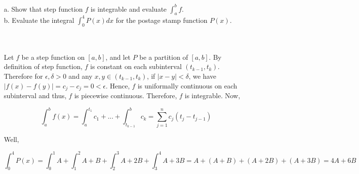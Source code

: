 a. Show that step function $f$ is integrable and evaluate $\int_a^bf$.\\

b. Evaluate the integral $\int_0^4P(x)dx$ for the postage stamp function $P(x)$.\\\\

\begin{solution}\renewcommand{\qedsymbol}{}\ \\
    Let $f$ be a step function on $[a,b]$, and let $P$ be a partition of $[a,b]$. By definition of step
    function, $f$ is constant on each subinterval $(t_{k-1},t_k)$. Therefore for $\epsilon,\delta>0$ and
    any $x,y\in(t_{k-1},t_k)$, if $|x-y|<\delta$, we have $|f(x)-f(y)|=c_j-c_j=0<\epsilon$. Hence, $f$
    is uniformally continuous on each subinterval and thus, $f$ is piecewise continuous. Therefore, $f$
    is integrable. Now,
    
    $$\int_a^bf(x)=\int_a^{t_1}c_1+...+\int_{t_{k-1}}^bc_k=\sum_{j=1}^nc_j(t_j-t_{j-1})$$

    Well,
    
    $$\int_0^4P(x)=\int_0^1A+\int_1^2A+B+\int_2^3A+2B+\int_3^4A+3B=A+(A+B)+(A+2B)+(A+3B)=4A+6B$$

\end{solution}